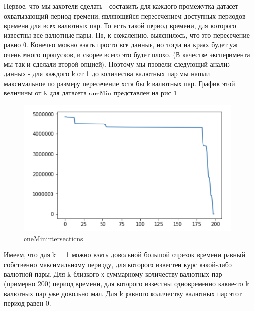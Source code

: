 \documentclass[11pt]{article}
\begin{document}
Первое, что мы захотели сделать - составить для каждого промежутка датасет охватывающий период времени, являющийся пересечением доступных периодов времени для всех валютных пар. То есть такой период времени, для которого известны все валютные пары. Но, к сожалению, выяснилось, что это пересечение равно 0. Конечно можно взять просто все данные, но тогда на краях будет уж очень много пропусков, и скорее всего это будет плохо. (В качестве эксперимента мы так и сделали второй опцией). Поэтому мы провели следующий анализ данных - для каждого k от 1 до количества валютных пар мы нашли максимальное по размеру пересечение хотя бы k валютных пар. График этой величины от k для датасета oneMin представлен на рис \ref{fig:oneMin_intersections}
\begin{figure}[!htb]
\includegraphics[width = 15cm]{oneMin_intersections.png}
\caption{oneMinintersections}
\label{fig:oneMin_intersections}
\end{figure}

Имеем, что для k = 1 можно взять довольной большой отрезок времени равный собственно максимальному периоду, для которого известен курс какой-либо валютной пары. Для k близкого к суммарному количеству валютных пар (примерно  200) период времени, для которого известны одновременно какие-то k валютных пар уже довольно мал. Для k равного количеству валютных пар этот период равен 0. 
\end{document}

